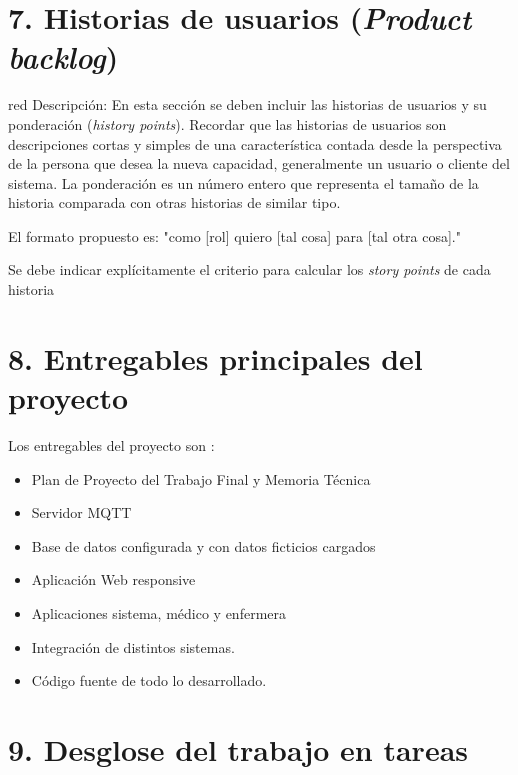 \documentclass[
11pt, %
]{charter}
\begin{document}
\begin{enumerate}
\end{enumerate}


\section{7. Historias de usuarios (\textit{Product backlog})}
\label{sec:backlog}

\begin{consigna}{red}
Descripción: En esta sección se deben incluir las historias de usuarios y su ponderación (\textit{history points}). Recordar que las historias de usuarios son descripciones cortas y simples de una característica contada desde la perspectiva de la persona que desea la nueva capacidad, generalmente un usuario o cliente del sistema. La ponderación es un número entero que representa el tamaño de la historia comparada con otras historias de similar tipo.

El formato propuesto es: "como [rol] quiero [tal cosa] para [tal otra cosa]."

Se debe indicar explícitamente el criterio para calcular los \textit{story points} de cada historia
\end{consigna}

\section{8. Entregables principales del proyecto}
\label{sec:entregables}



Los entregables del proyecto son :

\begin{itemize}
	\item Plan de Proyecto del Trabajo Final y Memoria Técnica
	\item Servidor MQTT 
	\item Base de datos configurada y con datos ficticios cargados
	\item Aplicación Web responsive
	\item Aplicaciones sistema, médico y enfermera
	\item Integración de distintos sistemas.
	\item Código fuente de todo lo desarrollado.
\end{itemize}



\section{9. Desglose del trabajo en tareas}
\label{sec:wbs}
\end{document}
